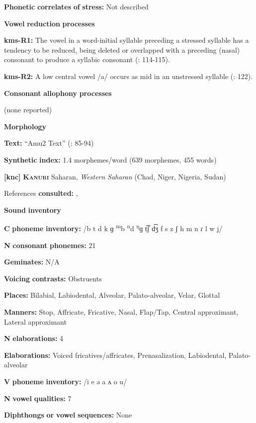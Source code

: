 \textbf{Phonetic} \textbf{correlates} \textbf{of} \textbf{stress:} Not described

\textbf{Vowel} \textbf{reduction} \textbf{processes}

\textbf{kms-R1:} The vowel in a word-initial syllable preceding a stressed syllable has a tendency to be reduced, being deleted or overlapped with a preceding (nasal) consonant to produce a syllabic consonant (\citealt{SandersSanders1980}: 114-115).

\textbf{kms-R2:} A low central vowel /a/ occurs as mid in an unstressed syllable (\citealt{SandersSanders1980}: 122).

\textbf{Consonant} \textbf{allophony} \textbf{processes}

(none reported)

\textbf{Morphology}

\textbf{Text:} “Amu2 Text” (\citealt{SandersSanders1994}: 85-94)

\textbf{Synthetic} \textbf{index:} 1.4 morphemes/word (639 morphemes, 455 words)

\textbf{[knc]}   \textbf{\textsc{Kanuri}}    Saharan, \textit{Western} \textit{Saharan} (Chad, Niger, Nigeria, Sudan)

References \textbf{consulted:} \citet{Cyffer1998}, \citet{Hutchison1981}

\textbf{Sound} \textbf{inventory}

\textbf{C} \textbf{phoneme} \textbf{inventory:} /b t d k ɡ \textsuperscript{m}b \textsuperscript{n}d \textsuperscript{ŋ}ɡ t͡ʃ d͡ʒ f s z ʃ h m n ɾ l w j/

\textbf{N} \textbf{consonant} \textbf{phonemes:} 21

\textbf{Geminates:} N/A

\textbf{Voicing} \textbf{contrasts:} Obstruents

\textbf{Places:} Bilabial, Labiodental, Alveolar, Palato-alveolar, Velar, Glottal

\textbf{Manners:} Stop, Affricate, Fricative, Nasal, Flap/Tap, Central approximant, Lateral approximant

\textbf{N} \textbf{elaborations:} 4

\textbf{Elaborations:} Voiced fricatives/affricates, Prenasalization, Labiodental, Palato-alveolar

\textbf{V} \textbf{phoneme} \textbf{inventory:} /i e ə a ʌ o u/

\textbf{N} \textbf{vowel} \textbf{qualities:} 7

\textbf{Diphthongs} \textbf{or} \textbf{vowel} \textbf{sequences:} None

